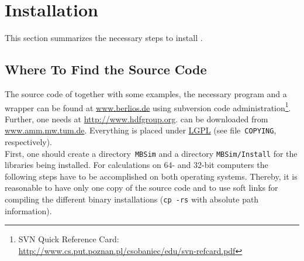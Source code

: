 \section{Installation}
This section summarizes the necessary steps to install \MBSim{} \cite{Foer06}.

\subsection{Where To Find the Source Code}
The source code of \MBSim{} together with some examples, the necessary \FMatVec{} program and a \HDF{} wrapper can be found at \url{www.berlios.de} using subversion code administration\footnote{SVN Quick Reference Card: \url{http://www.cs.put.poznan.pl/csobaniec/edu/svn-refcard.pdf}}. Further, one needs \HDF{} at \url{http://www.hdfgroup.org}. \AMVis{} can be downloaded from \url{www.amm.mw.tum.de}. Everything is placed under \href{http://www.gnu.org/licenses/lgpl.html}{LGPL} (see file~\texttt{COPYING}, respectively).\\
First, one should create a directory~\texttt{MBSim} and a directory \texttt{MBSim/Install} for the libraries being installed. For calculations on 64- and 32-bit computers the following steps have to be accomplished on both operating systems. Thereby, it is reasonable to have only one copy of the source code and to use soft links for compiling the different binary installations (\texttt{cp -rs} with absolute path information).

